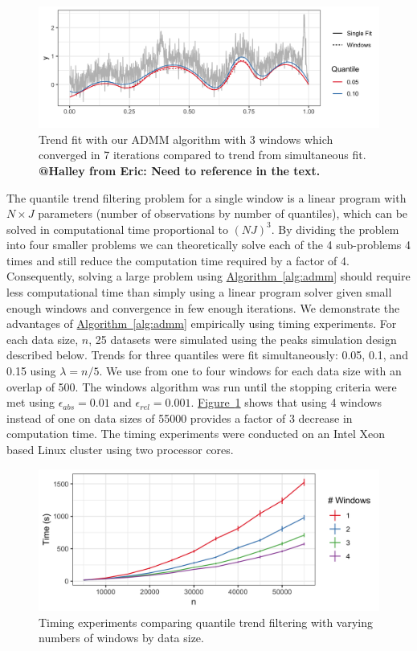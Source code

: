 \documentclass[aoas]{imsart}
\makeatletter
\newcommand{\Halley}[2]{{\bf {\color{purple}@Halley from #1: #2}}\xspace}
\newcommand{\Fig}[1]{\hyperref[fig:#1]{Figure~\ref*{fig:#1}}} %
\newcommand{\Alg}[1]{\hyperref[alg:#1]{Algorithm~\ref*{alg:#1}}} %
\newcommand{\Fig}[1]{{Figure~\ref{fig:#1}}} %
\newcommand{\Alg}[1]{{Algorithm~\ref{alg:#1}}} %
\makeatother
\begin{document}
\begin{figure}
	\centering
	\includegraphics[width = 0.8\linewidth]{Figures/admm_windows.png}
	\caption{Trend fit with our ADMM algorithm with 3 windows which converged in 7 iterations compared to trend from simultaneous fit. \Halley{Eric}{Need to reference in the text.}}
\end{figure}

The quantile trend filtering problem for a single window is a linear program with $N\times J$ parameters (number of observations by number of quantiles), which can be solved in computational time proportional to $(NJ)^3$. By dividing the problem into four smaller problems we can theoretically solve each of the 4 sub-problems 4 times and still reduce the computation time required by a factor of 4. Consequently, solving a large problem using \Alg{admm} should require less computational time than simply using a linear program solver given small enough windows and convergence in few enough iterations. We demonstrate the advantages of \Alg{admm} empirically using timing experiments. For each data size, $n$, 25 datasets were simulated using the peaks simulation design described below. Trends for three quantiles were fit simultaneously: 0.05, 0.1, and 0.15 using $\lambda = n/5$. We use from one to four windows for each data size with an overlap of 500. The windows algorithm was run until the stopping criteria were met using $\epsilon_{abs} = 0.01$ and $\epsilon_{rel} = 0.001$. \Fig{timing} shows that using 4 windows instead of one on data sizes of 55000 provides a factor of 3 decrease in computation time. The timing experiments were conducted on an Intel Xeon based Linux cluster using two processor cores.


\begin{figure}[!t]
	\centering
	\includegraphics[width = 0.7\linewidth]{Figures/Fig_timing_experiment.png}
	\caption{Timing experiments comparing quantile trend filtering with varying numbers of windows by data size.}
	\label{fig:timing}
\end{figure}
\end{document}
